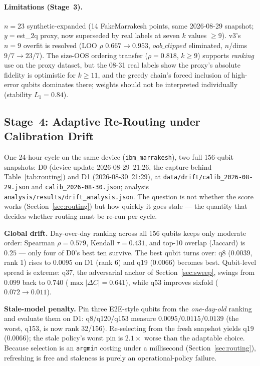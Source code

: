 ﻿\documentclass[12pt,a4paper]{article}
\begin{document}
\paragraph{Limitations (Stage~3).} $n{=}23$ synthetic-expanded (14 FakeMarrakesh points, same 2026-08-29 snapshot; $y{=}$est\_2q proxy, now superseded by real labels at seven $k$ values ${\ge}9$). v3's $n{=}9$ overfit is resolved (LOO $\rho$ $0.667{\to}0.953$, $oob\_clipped$ eliminated, $n$/dims $9/7{\to}23/7$). The size-OOS ordering transfer ($\rho=0.818$, $k{\ge}9$) supports \emph{ranking} use on the proxy dataset, but the 08-31 real labels show the proxy's absolute fidelity is optimistic for $k\ge 11$, and the greedy chain's forced inclusion of high-error qubits dominates there; weights should not be interpreted individually (stability $L_1{=}0.84$).


\subsection{Stage~4: Adaptive Re-Routing under Calibration Drift}\label{sec:adaptive}

One 24-hour cycle on the same device (\texttt{ibm\_marrakesh}), two full 156-qubit snapshots: D0 (device update 2026-08-29~21:26, the capture behind Table~\ref{tab:routing}) and D1 (2026-08-30~21:29), at \texttt{data/drift/calib\_2026-08-29.json} and \texttt{calib\_2026-08-30.json}; analysis \texttt{analysis/results/drift\_analysis.json}. The question is not whether the score works (Section~\ref{sec:routing}) but how quickly it goes stale --- the quantity that decides whether routing must be re-run per cycle.

\textbf{Global drift.} Day-over-day ranking across all 156 qubits keeps only moderate order: Spearman $\rho=0.579$, Kendall $\tau=0.431$, and top-10 overlap (Jaccard) is $0.25$ --- only four of D0's best ten survive. The best qubit turns over: q8 (0.0039, rank 1) rises to $0.0095$ on D1 (rank 6) and q19 ($0.0066$) becomes best. Qubit-level spread is extreme: q37, the adversarial anchor of Section~\ref{sec:sweep}, swings from $0.099$ back to $0.740$ ($\max|\Delta C|=0.641$), while q53 improves sixfold ($0.072\to 0.011$).

\textbf{Stale-model penalty.} Pin three E2E-style qubits from the \emph{one-day-old} ranking and evaluate them on D1: q8/q120/q153 measure $0.0095 / 0.0115 / 0.0139$ (the worst, q153, is now rank 32/156). Re-selecting from the fresh snapshot yields q19 ($0.0066$); the stale policy's worst pin is $2.1\times$ worse than the adaptable choice. Because selection is an \texttt{argmin} costing under a millisecond (Section~\ref{sec:routing}), refreshing is free and staleness is purely an operational-policy failure.
\end{document}
